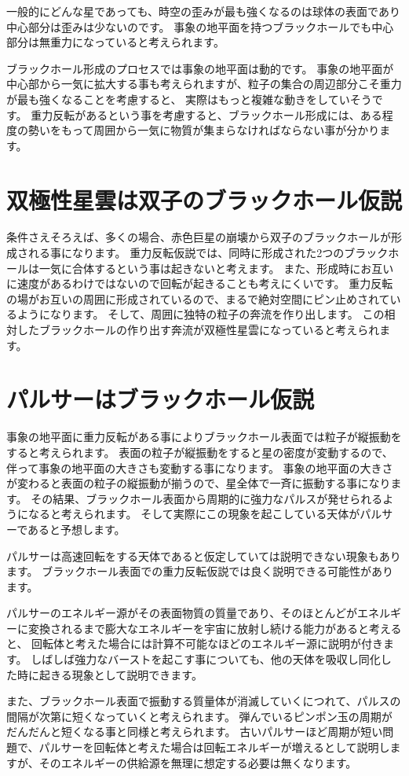 \documentclass[a4paper,12pt,notitlepage]{jsreport}
\begin{document}
一般的にどんな星であっても、時空の歪みが最も強くなるのは球体の表面であり中心部分は歪みは少ないのです。
事象の地平面を持つブラックホールでも中心部分は無重力になっていると考えられます。

ブラックホール形成のプロセスでは事象の地平面は動的です。
事象の地平面が中心部から一気に拡大する事も考えられますが、粒子の集合の周辺部分こそ重力が最も強くなることを考慮すると、
実際はもっと複雑な動きをしていそうです。
重力反転があるという事を考慮すると、ブラックホール形成には、ある程度の勢いをもって周囲から一気に物質が集まらなければならない事が分かります。

\section{双極性星雲は双子のブラックホール仮説}

条件さえそろえば、多くの場合、赤色巨星の崩壊から双子のブラックホールが形成される事になります。
重力反転仮説では、同時に形成された2つのブラックホールは一気に合体するという事は起きないと考えます。
また、形成時にお互いに速度があるわけではないので回転が起きることも考えにくいです。
重力反転の場がお互いの周囲に形成されているので、まるで絶対空間にピン止めされているようになります。
そして、周囲に独特の粒子の奔流を作り出します。
この相対したブラックホールの作り出す奔流が双極性星雲になっていると考えられます。

\section{パルサーはブラックホール仮説}

事象の地平面に重力反転がある事によりブラックホール表面では粒子が縦振動をすると考えられます。
表面の粒子が縦振動をすると星の密度が変動するので、伴って事象の地平面の大きさも変動する事になります。
事象の地平面の大きさが変わると表面の粒子の縦振動が揃うので、星全体で一斉に振動する事になります。
その結果、ブラックホール表面から周期的に強力なパルスが発せられるようになると考えられます。
そして実際にこの現象を起こしている天体がパルサーであると予想します。

パルサーは高速回転をする天体であると仮定していては説明できない現象もあります。
ブラックホール表面での重力反転仮説では良く説明できる可能性があります。

パルサーのエネルギー源がその表面物質の質量であり、そのほとんどがエネルギーに変換されるまで膨大なエネルギーを宇宙に放射し続ける能力があると考えると、
回転体と考えた場合には計算不可能なほどのエネルギー源に説明が付きます。
しばしば強力なバーストを起こす事についても、他の天体を吸収し同化した時に起きる現象として説明できます。

また、ブラックホール表面で振動する質量体が消滅していくにつれて、パルスの間隔が次第に短くなっていくと考えられます。
弾んでいるピンポン玉の周期がだんだんと短くなる事と同様と考えられます。
古いパルサーほど周期が短い問題で、パルサーを回転体と考えた場合は回転エネルギーが増えるとして説明しますが、そのエネルギーの供給源を無理に想定する必要は無くなります。
\end{document}
